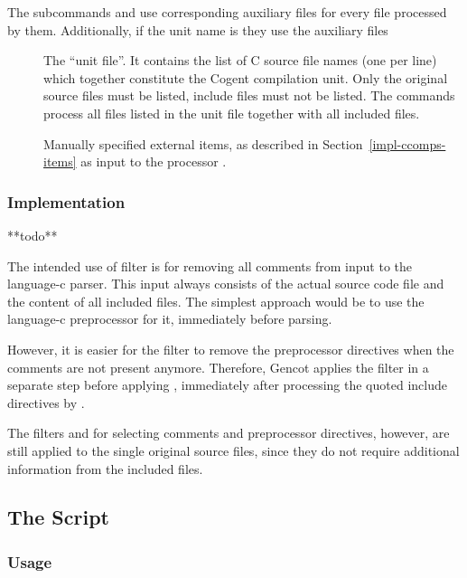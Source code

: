 The subcommands  and  use corresponding auxiliary files for every file  processed by them.
Additionally, if the unit name is  they use the auxiliary files
\begin{description}
\item[] The ``unit file''. It contains the list of C source file names
(one per line) which together constitute the Cogent compilation unit. Only the original source files  must 
be listed, include files  must not be listed. The commands process all files listed in the unit file
together with all included files.
\item[] Manually specified external items, as described in Section~\ref{impl-ccomps-items} as
input to the processor .
\end{description}

\subsubsection{Implementation}

**todo**

The intended use of filter  is for removing all comments from input to the language-c parser.
This input always consists of the actual source code file and the content of all included files. The simplest approach
would be to use the language-c preprocessor for it, immediately before parsing. 

However, it is easier for the filter  to remove the preprocessor directives when the comments are 
not present anymore. Therefore, Gencot applies the filter  in a separate step before applying
, immediately after processing the quoted include directives by .
 
The filters  and  for selecting comments and preprocessor directives, however, are
still applied to the single original source files, since they do not require additional information from the included files.


\subsection{The  Script}
\label{impl-all-items}

\subsubsection{Usage}


